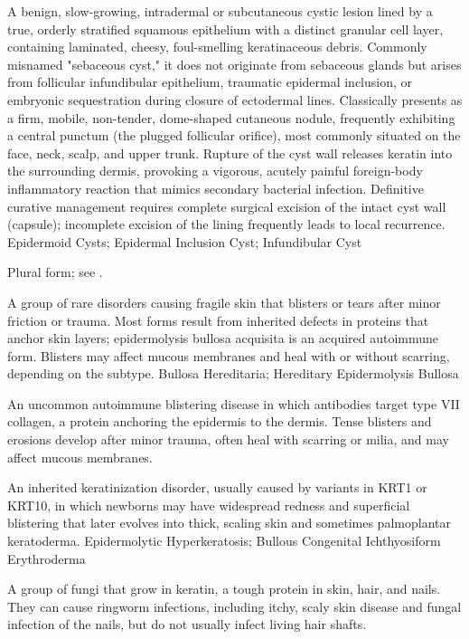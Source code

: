  A benign, slow-growing, intradermal or subcutaneous cystic lesion lined by a true, orderly stratified squamous epithelium with a distinct granular cell layer, containing laminated, cheesy, foul-smelling keratinaceous debris. Commonly misnamed "sebaceous cyst," it does not originate from sebaceous glands but arises from follicular infundibular epithelium, traumatic epidermal inclusion, or embryonic sequestration during closure of ectodermal lines. Classically presents as a firm, mobile, non-tender, dome-shaped cutaneous nodule, frequently exhibiting a central punctum (the plugged follicular orifice), most commonly situated on the face, neck, scalp, and upper trunk. Rupture of the cyst wall releases keratin into the surrounding dermis, provoking a vigorous, acutely painful foreign-body inflammatory reaction that mimics secondary bacterial infection. Definitive curative management requires complete surgical excision of the intact cyst wall (capsule); incomplete excision of the lining frequently leads to local recurrence.
\synonyms
Epidermoid Cysts; Epidermal Inclusion Cyst; Infundibular Cyst

 Plural form; see .

 A group of rare disorders causing fragile skin that blisters or tears after
minor friction or trauma. Most forms result from inherited defects in proteins that anchor
skin layers; epidermolysis bullosa acquisita is an acquired autoimmune form. Blisters may
affect mucous membranes and heal with or without scarring, depending on the subtype.
\synonyms
Bullosa Hereditaria; Hereditary Epidermolysis Bullosa

 An uncommon autoimmune blistering disease in which antibodies target type VII collagen, a protein anchoring the epidermis to the dermis. Tense blisters and erosions develop after minor trauma, often heal with scarring or milia, and may affect mucous membranes.

 An inherited keratinization disorder, usually caused by variants in KRT1 or KRT10, in which newborns may have widespread redness and superficial blistering that later evolves into thick, scaling skin and sometimes palmoplantar keratoderma.
\synonyms
Epidermolytic Hyperkeratosis; Bullous Congenital Ichthyosiform Erythroderma

 A group of fungi that grow in keratin, a tough protein in skin, hair, and nails. They can cause ringworm infections, including itchy, scaly skin disease and fungal infection of the nails, but do not usually infect living hair shafts.

